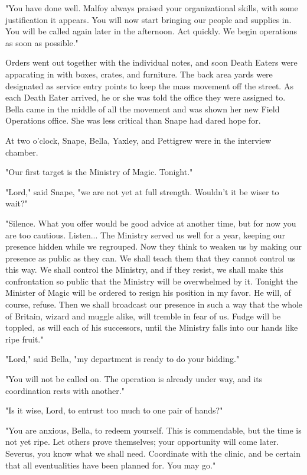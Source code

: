 \documentclass[a4paper,11pt]{article}
\begin{document}
"You have done well. Malfoy always praised your organizational skills, with some justification it appears. You will now start bringing our people and supplies in. You will be called again later in the afternoon. Act quickly. We begin operations as soon as possible."

Orders went out together with the individual notes, and soon Death Eaters were apparating in with boxes, crates, and furniture. The back area yards were designated as service entry points to keep the mass movement off the street. As each Death Eater arrived, he or she was told the office they were assigned to. Bella came in the middle of all the movement and was shown her new Field Operations office. She was less critical than Snape had dared hope for.

At two o'clock, Snape, Bella, Yaxley, and Pettigrew were in the interview chamber.

"Our first target is the Ministry of Magic. Tonight."

"Lord," said Snape, "we are not yet at full strength. Wouldn't it be wiser to wait?"

"Silence. What you offer would be good advice at another time, but for now you are too cautious. Listen... The Ministry served us well for a year, keeping our presence hidden while we regrouped. Now they think to weaken us by making our presence as public as they can. We shall teach them that they cannot control us this way. We shall control the Ministry, and if they resist, we shall make this confrontation so public that the Ministry will be overwhelmed by it. Tonight the Minister of Magic will be ordered to resign his position in my favor. He will, of course, refuse. Then we shall broadcast our presence in such a way that the whole of Britain, wizard and muggle alike, will tremble in fear of us. Fudge will be toppled, as will each of his successors, until the Ministry falls into our hands like ripe fruit."

"Lord," said Bella, "my department is ready to do your bidding."

"You will not be called on. The operation is already under way, and its coordination rests with another."

"Is it wise, Lord, to entrust too much to one pair of hands?"

"You are anxious, Bella, to redeem yourself. This is commendable, but the time is not yet ripe. Let others prove themselves; your opportunity will come later. Severus, you know what we shall need. Coordinate with the clinic, and be certain that all eventualities have been planned for. You may go."
\end{document}
